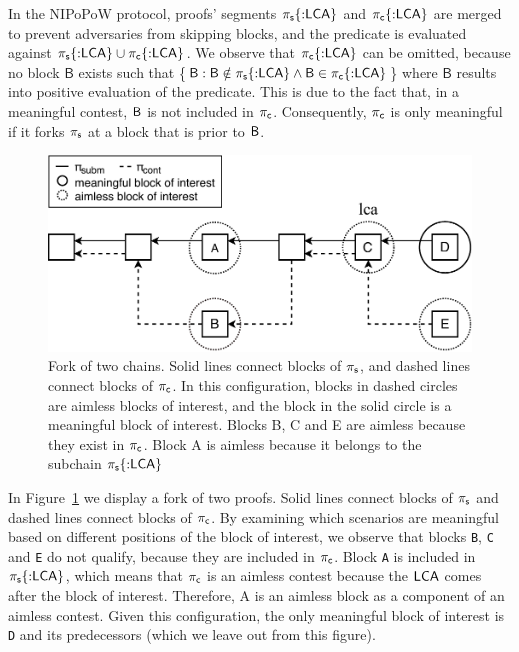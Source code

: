 \newcommand{\block}{\mathsf{B}}

In the NIPoPoW protocol, proofs' segments $\mathsf{\pi_{s}}\{{{:}}\mathsf{LCA}\}$ and
$\mathsf{\pi_{c}}\{{:}\mathsf{LCA}\}$ are merged to prevent adversaries from skipping
blocks, and the predicate is evaluated against $\mathsf{\pi_{s}}\{{:}\mathsf{LCA}\} \cup
\mathsf{\pi_{c}}\{{:}\mathsf{LCA}\}$. We observe that $\mathsf{\pi_{c}}\{{:}\mathsf{LCA}\}$ can be omitted, because no
block $\block$ exists such that \{$\block : \block \notin \pis\{{:}\lca\} \land
\block \in \pic\{{:}\lca\}$\} where $\block$ results into positive evaluation
of the predicate. This is due to the fact that, in a meaningful contest, $\mathsf{B}$
is not included in $\mathsf{\pi_{c}}$. Consequently, $\mathsf{\pi_{c}}$ is only meaningful if it forks
$\mathsf{\pi_{s}}$ at a block that is prior to $\mathsf{B}$.

\renewcommand{\block}{}

\begin{figure}[h]
    \begin{center}
        \includegraphics[width=1\columnwidth]{figures/boi-position.pdf}
    \end{center}
\vspace*{-5mm}
    \caption{Fork of two chains. Solid lines connect blocks of $\mathsf{\pi_{s}}$,
    and dashed lines connect blocks of $\mathsf{\pi_{c}}$. In this configuration,
    blocks in dashed circles are aimless blocks of interest, and the block
    in the solid circle is a meaningful block of interest. Blocks B, C and E are
    aimless because they exist in $\mathsf{\pi_{c}}$. Block A is aimless because it
    belongs to the subchain $\mathsf{\pi_{s}}\{{:}\mathsf{LCA}\}$}
    \label{fig:boi-position}
\vspace*{-4mm}
\end{figure}

In Figure~\ref{fig:boi-position} we display a fork of two proofs. Solid lines
connect blocks of $\mathsf{\pi_{s}}$ and dashed lines connect blocks of $\mathsf{\pi_{c}}$. By
examining which scenarios are meaningful based on different positions of the
block of interest, we observe that blocks \texttt{B}, \texttt{C} and \texttt{E}
do not qualify, because they are included in $\mathsf{\pi_{c}}$. Block \texttt{A} is
included in $\mathsf{\pi_{s}}\{{:}\mathsf{LCA}\}$, which means that $\mathsf{\pi_{c}}$ is an aimless contest
because the $\mathsf{LCA}$ comes after the block of interest. Therefore, A is an
aimless block as a component of an aimless contest. Given this configuration,
the only meaningful block of interest is \texttt{D} and its predecessors (which
we leave out from this figure).

